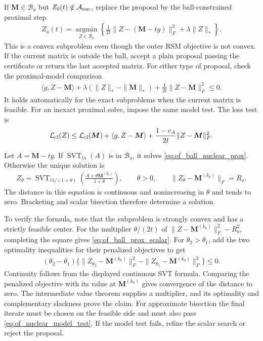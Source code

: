 \documentclass[numsec,webpdf,modern,large,namedate]{oup-authoring-template}
\theoremstyle{plain}
\theoremstyle{remark}
\newcommand{\M}{\bm{M}}
\newif\ifmarkchanges
\newenvironment{revision}{\begingroup\ifmarkchanges\color{red}\fi}{\endgroup}
\begin{document}
\begin{revision}
If $\M\in\mathcal B_a$ but $Z_0(t)\notin\mathcal A_{\rm nuc}$, replace
the proposal by the ball-constrained proximal step
\begin{align}
 Z_a(t)=\operatorname*{argmin}_{Z\in\mathcal B_a}
 \left\{\frac1{2t}\|Z-(\M-tg)\|_F^2+\lambda\|Z\|_*\right\}.
 \label{eq:of_ball_nuclear_prox}
\end{align}
This is a convex subproblem even though the outer RSM objective is not
convex. If the current matrix is outside the ball, accept a plain
proposal passing the certificate or return the last accepted matrix.
For either type of proposal, check the proximal-model comparison
\begin{align}
 \langle g,Z-\M\rangle+\lambda(\|Z\|_*-\|\M\|_*)
       +\frac{1}{2t}\|Z-\M\|_F^2\le0.
 \label{eq:of_nuclear_model_test}
\end{align}
It holds automatically for the exact subproblems when the current matrix
is feasible. For an inexact proximal solve, impose the same model test.
The loss test is
\begin{align}
 \mathcal L_{\rm cl}(Z)
 \le\mathcal L_{\rm cl}(\M)+\langle g,Z-\M\rangle
       +\frac{1-c_A}{2t}\|Z-\M\|_F^2.
 \label{eq:of_nuclear_majorization}
\end{align}

Let $A=\M-tg$.  If $\operatorname{SVT}_{t\lambda}(A)$ is in
$\mathcal B_a$, it solves \eqref{eq:of_ball_nuclear_prox}.  Otherwise the
unique solution is
\begin{align}
 Z_\theta=
 \operatorname{SVT}_{t\lambda/(1+\theta)}
       \left(\frac{A+\theta\M^{(k_0)}}{1+\theta}\right),
 \qquad \theta>0,
 \qquad\|Z_\theta-\M^{(k_0)}\|_F=R_a.
 \label{eq:of_ball_prox_scalar}
\end{align}
The distance in this equation is continuous and nonincreasing in $\theta$
and tends to zero.  Bracketing and scalar bisection therefore determine a
solution.

To verify the formula, note that the subproblem is strongly convex and has a strictly feasible center.
For the multiplier $\theta/(2t)$ of
$\|Z-\M^{(k_0)}\|_F^2-R_a^2$, completing the square gives
\eqref{eq:of_ball_prox_scalar}.  For $\theta_2>\theta_1$, add the two
optimality inequalities for their penalized objectives to get
\begin{align*}
 (\theta_2-\theta_1)
 \{\|Z_{\theta_2}-\M^{(k_0)}\|_F^2
       -\|Z_{\theta_1}-\M^{(k_0)}\|_F^2\}\le0.
\end{align*}
Continuity follows from the displayed continuous SVT formula.  Comparing
the penalized objective with its value at $\M^{(k_0)}$ gives convergence
of the distance to zero.  The intermediate value theorem supplies a
multiplier, and its optimality and complementary slackness prove the claim.
For approximate bisection the final iterate must be chosen on the feasible
side and must also pass \eqref{eq:of_nuclear_model_test}.  If the model test
fails, refine the scalar search or reject the proposal.



\end{revision}
\end{document}
